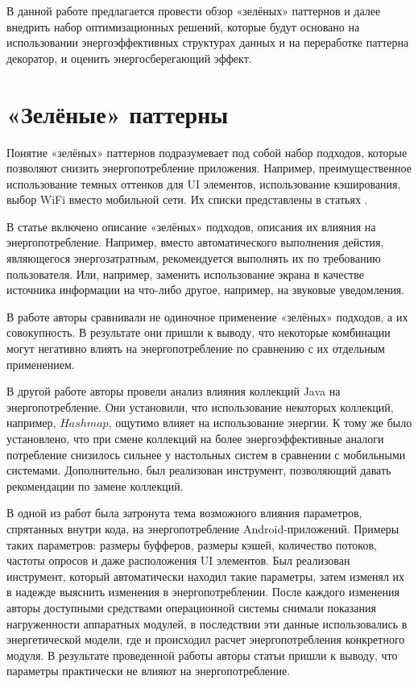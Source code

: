 \documentclass{math-mech-sci}
\begin{document}
    В данной работе предлагается провести обзор «зелёных» паттернов и далее внедрить набор оптимизационных решений, которые будут основано на использовании энергоэффективных структурах данных и на переработке паттерна декоратор, и оценить энергосберегающий эффект.


\section{«Зелёные» паттерны}
        Понятие «зелёных» паттернов подразумевает под собой набор подходов, которые позволяют снизить энергопотребление приложения. Например, преимущественное использование темных оттенков для UI элементов, использование кэширования, выбор WiFi вместо мобильной сети. Их списки представлены в статьях \cite{10.1145/3561320.3561328, 10.1007/s10664-019-09682-0}.

        В статье \cite{Feitosa2021PatternsAE} включено описание «зелёных» подходов, описания их влияния на энергопотребление. Например, вместо автоматического выполнения дейстия, являющегося энергозатратным, рекомендуется выполнять их по требованию пользователя. Или, например, заменить использование экрана в качестве источника информации на что-либо другое, например, на звуковые уведомления.
        
        В работе \cite{9054858} авторы сравнивали не одиночное применение «зелёных» подходов, а их совокупность. В результате они пришли к выводу, что некоторые комбинации могут негативно влиять на энергопотребление по сравнению с их отдельным применением.

        В другой работе \cite{10.1007/s10664-021-09950-y} авторы провели анализ влияния коллекций Java на энергопотребление. Они установили, что использование некоторых коллекций, например, \(Hashmap\), ощутимо влияет на использование энергии. К тому же было установлено, что при смене коллекций на более энергоэффективные аналоги потребление снизилось сильнее у настольных систем в сравнении с мобильными системами. Дополнительно, был реализован инструмент, позволяющий давать рекомендации по замене коллекций.

        В одной из работ \cite{9825870} была затронута тема возможного влияния параметров, спрятанных внутри кода, на энергопотребление Android-приложений. Примеры таких параметров: размеры буфферов, размеры кэшей, количество потоков, частоты опросов и даже расположения UI элементов. Был реализован инструмент, который автоматически находил такие параметры, затем изменял их в надежде выяснить изменения в энергопотреблении. После каждого изменения авторы доступными средствами операционной системы снимали показания нагруженности аппаратных модулей, в последствии эти данные использовались в энергетической модели, где и происходил расчет энергопотребления конкретного модуля. В результате проведенной работы авторы статьи пришли к выводу, что параметры практически не влияют на энергопотребление.
\end{document}
